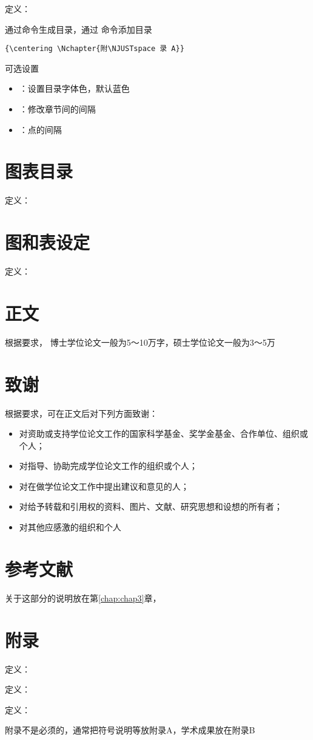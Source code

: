 定义：

通过\ilcode{\tableofcontents}命令生成目录，通过\ilcode{{\Nchapter}}
命令添加目录
\begin{lstlisting}[style=mylatex]
  {\centering \Nchapter{附\NJUSTspace 录 A}}
\end{lstlisting}
可选设置
\begin{itemize}
  \item \ilcode{\hypersetup{linkcolor=blue}}：设置目录字体色，默认蓝色
  \item \ilcode{ \vskip 0.0em \@plus\p@}：修改章节间的间隔
  \item \ilcode{\renewcommand{\@dotsep}{4.5}}：点的间隔
\end{itemize}

\section{图表目录}

定义：

\section{图和表设定}

定义：

\section{正文}

根据要求，
博士学位论文一般为5～10万字，硕士学位论文一般为3～5万

\section{致谢}

根据要求，可在正文后对下列方面致谢：
\begin{itemize}
  \item 对资助或支持学位论文工作的国家科学基金、奖学金基金、合作单位、组织或个人；
  \item 对指导、协助完成学位论文工作的组织或个人；
  \item 对在做学位论文工作中提出建议和意见的人；
  \item 对给予转载和引用权的资料、图片、文献、研究思想和设想的所有者；
  \item 对其他应感激的组织和个人
\end{itemize}

\section{参考文献}

关于这部分的说明放在第\ref{chap:chap3}章，

\section{附录}

定义：\redstar

定义：\redstar

定义：

附录不是必须的，通常把符号说明等放附录A，学术成果放在附录B
